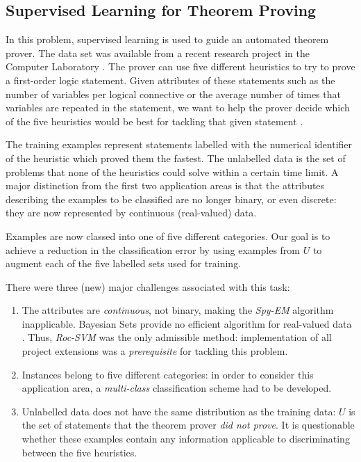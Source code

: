 \documentclass[12pt,twoside,notitlepage,amsart]{report} %
\begin{document}
	\subsection{Supervised Learning for Theorem Proving} 
	
	In this problem, supervised learning is used to guide an automated theorem prover. The data set was available from a recent research project in the Computer Laboratory \cite{Bridge13}. The prover can use five different heuristics to try to prove a first-order logic statement. Given attributes of these statements such as the number of variables per logical connective or the average number of times that variables are repeated in the statement, we want to help the prover decide which of the five heuristics would be best for tackling that given statement \cite{Bridge13}. 
	
	
	The training examples represent statements labelled with the numerical identifier of the heuristic which proved them the fastest. The unlabelled data is the set of problems that {none of the heuristics} could solve within a certain time limit. A major distinction from the first two application areas is that the attributes describing the examples to be classified are no longer binary, or even discrete: they are now represented by {continuous (real-valued) data}.
	
	Examples are now classed into one of {five} different categories. Our goal is to achieve a reduction in the classification error by using examples from $U$ to {augment} each of the five labelled sets used for training. %
	
	There were three (new) major challenges associated with this task: 
	\begin{enumerate}
	
	\item The attributes are \emph{continuous}, not binary, making the \emph{Spy-EM} algorithm inapplicable. Bayesian Sets provide no {efficient} algorithm for real-valued data \cite{Ghahramani06}. Thus, \emph{Roc-SVM} was the only admissible method: implementation of all project extensions was a \emph{prerequisite} for tackling this problem. 
	
	\item Instances belong to five different categories: in order to consider this application area, a \emph{multi-class} classification scheme had to be developed.  
	
	\item Unlabelled data does {not} have the same distribution as the training data: $U$ is the set of statements that the theorem prover \emph{did not prove}. It is questionable whether these examples contain any information applicable to discriminating between the five heuristics.
	
	\end{enumerate}
	
\end{document}
